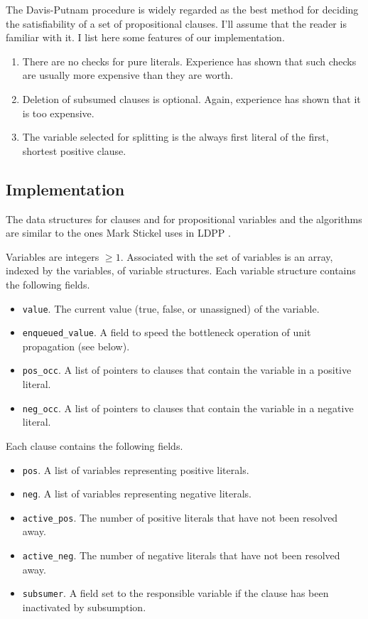 The Davis-Putnam procedure is widely regarded as the best method
for deciding the satisfiability of a set of propositional clauses.
I'll assume that the reader is familiar with it.  I list here some
features of our implementation.
\begin{enumerate}
\item There are no checks for pure literals.  Experience has shown that
such checks are usually more expensive than they are worth.
\item Deletion of subsumed clauses is optional.  Again, experience
has shown that it is too expensive.
\item The variable selected for splitting is the always first literal
of the first, shortest positive clause.
\end{enumerate}

\subsection{Implementation}

The data structures for clauses and for propositional variables and
the algorithms are similar to the ones Mark Stickel uses in LDPP
\cite{dp-trie}.

Variables are integers $\geq 1$.  Associated with the set of variables
is an array, indexed by the variables, of variable structures.  Each
variable structure contains the following fields.
\begin{itemize}
\item {\verb:value:.}
The current value (true, false, or unassigned) of the variable.
\item {\verb:enqueued_value:.}
A field to speed the bottleneck operation of unit propagation (see below).
\item {\verb:pos_occ:.}
A list of pointers to clauses that contain the
variable in a positive literal.
\item {\verb:neg_occ:.}
A list of pointers to clauses that contain the
variable in a negative literal.
\end{itemize}
Each clause contains the following fields.
\begin{itemize}
\item {\verb:pos:.}
A list of variables representing positive literals.
\item {\verb:neg:.}
A list of variables representing negative literals.
\item {\verb:active_pos:.}
The number of positive literals that have not been resolved away.
\item {\verb:active_neg:.}
The number of negative literals that have not been resolved away.
\item {\verb:subsumer:.}
A field set to the responsible variable if the clause has been
inactivated by subsumption.
\end{itemize}

